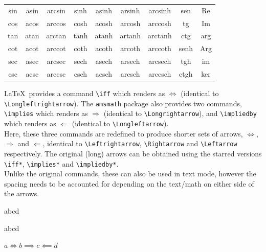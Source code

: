 \documentclass{article}
\begin{document}
{\begin{center}
    \begin{tabular}{*{9}{c}} %
        sin & asin & arcsin & sinh & asinh & arsinh & arcsinh & sen  & Re \\
        cos & acos & arccos & cosh & acosh & arcosh & arccosh & tg   & Im \\
        tan & atan & arctan & tanh & atanh & artanh & arctanh & ctg  & arg \\
        cot & acot & arccot & coth & acoth & arcoth & arccoth & senh & Arg \\
        sec & asec & arcsec & sech & asech & arsech & arcsech & tgh  & im \\
        csc & acsc & arccsc & csch & acsch & arcsch & arccsch & ctgh & ker
    \end{tabular}
\end{center}

\LaTeX\ provides a command \verb!\iff! which renders as $\Longleftrightarrow$ (identical to \verb!\Longleftrightarrow!). The \texttt{amsmath} package also provides two commands, \verb!\implies! which renders as $\Longrightarrow$ (identical to \verb!\Longrightarrow!), and \verb!\impliedby! which renders as $\Longleftarrow$ (identical to \verb!\Longleftarrow!).\\

Here, these three commands are redefined to produce shorter sets of arrows, $\Leftrightarrow$, $\Rightarrow$ and $\Leftarrow$, identical to \verb!\Leftrightarrow!, \verb!\Rightarrow! and \verb!\Leftarrow! respectively. The original (long) arrows can be obtained using the starred versions \verb!\iff*!, \verb!\implies*! and \verb!\impliedby*!.\\

Unlike the original commands, these can also be used in text mode, however the spacing needs to be accounted for depending on the text/math on either side of the arrows.

\begin{verbbox}
a\iff b\implies c\impliedby d
\end{verbbox}

\begin{verbbox}
a\iff* b\implies* c\impliedby* d
\end{verbbox}

\begin{verbbox}
$a\iff b\implies c\impliedby d$
\end{verbbox}

}
\end{document}
